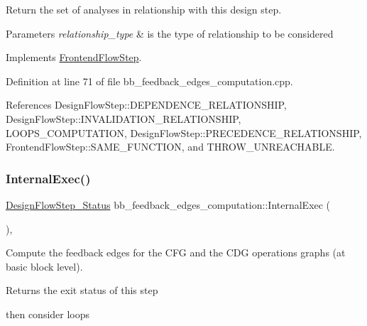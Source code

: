 Return the set of analyses in relationship with this design step. 


\begin{DoxyParams}{Parameters}
{\em relationship\+\_\+type} & is the type of relationship to be considered \\
\hline
\end{DoxyParams}


Implements \hyperlink{classFrontendFlowStep_abeaff70b59734e462d347ed343dd700d}{Frontend\+Flow\+Step}.



Definition at line 71 of file bb\+\_\+feedback\+\_\+edges\+\_\+computation.\+cpp.



References Design\+Flow\+Step\+::\+D\+E\+P\+E\+N\+D\+E\+N\+C\+E\+\_\+\+R\+E\+L\+A\+T\+I\+O\+N\+S\+H\+IP, Design\+Flow\+Step\+::\+I\+N\+V\+A\+L\+I\+D\+A\+T\+I\+O\+N\+\_\+\+R\+E\+L\+A\+T\+I\+O\+N\+S\+H\+IP, L\+O\+O\+P\+S\+\_\+\+C\+O\+M\+P\+U\+T\+A\+T\+I\+ON, Design\+Flow\+Step\+::\+P\+R\+E\+C\+E\+D\+E\+N\+C\+E\+\_\+\+R\+E\+L\+A\+T\+I\+O\+N\+S\+H\+IP, Frontend\+Flow\+Step\+::\+S\+A\+M\+E\+\_\+\+F\+U\+N\+C\+T\+I\+ON, and T\+H\+R\+O\+W\+\_\+\+U\+N\+R\+E\+A\+C\+H\+A\+B\+LE.

\mbox{\label{classbb__feedback__edges__computation_ab4010208bcd24cdf7c8ff640dc2c2694}} 
\subsubsection{\texorpdfstring{Internal\+Exec()}{InternalExec()}}
{\footnotesize\ttfamily \hyperlink{design__flow__step_8hpp_afb1f0d73069c26076b8d31dbc8ebecdf}{Design\+Flow\+Step\+\_\+\+Status} bb\+\_\+feedback\+\_\+edges\+\_\+computation\+::\+Internal\+Exec (\begin{DoxyParamCaption}{ }\end{DoxyParamCaption})\hspace{0.3cm}{\ttfamily [override]}, {\ttfamily [virtual]}}



Compute the feedback edges for the C\+FG and the C\+DG operations graphs (at basic block level). 

\begin{DoxyReturn}{Returns}
the exit status of this step 
\end{DoxyReturn}
then consider loops

